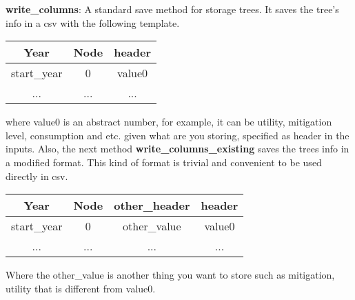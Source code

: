 \documentclass[12pt]{article}
\begin{document}
\textbf{write\_columns}: A standard save method for storage trees. It saves the tree's info in a csv with the following template. \begin{center}
\begin{tabular}{ |c|c|c| }
 \hline
 Year  &  Node  & header  \\
 \hline
 start\_year & 0 & value0 \\
 \hline
 ... & ... & ... \\
 \hline
\end{tabular}
\end{center}
where value0 is an abstract number, for example, it can be utility, mitigation level, consumption and etc. given what are you storing, specified as header in the inputs.
Also, the next method \textbf{write\_columns\_existing} saves the trees info in a modified format.
This kind of format is trivial and convenient to be used directly in csv.
\begin{center}
\begin{tabular}{ |c|c|c|c| }
 \hline
 Year  &  Node  & other\_header & header  \\
 \hline
 start\_year & 0 & other\_value & value0 \\
 \hline
 ... & ... & ... & ... \\
 \hline
\end{tabular}
\end{center}
Where the other\_value is another thing you want to store such as mitigation, utility that is different from value0.
\end{document}
